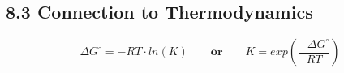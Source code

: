 \subsection{8.3 Connection to Thermodynamics}
    $$
      \Delta G^\circ = - R T \cdot ln(K) \qquad \textbf{or} \qquad K = exp(\frac{-\Delta G^\circ}{R T})  
    $$